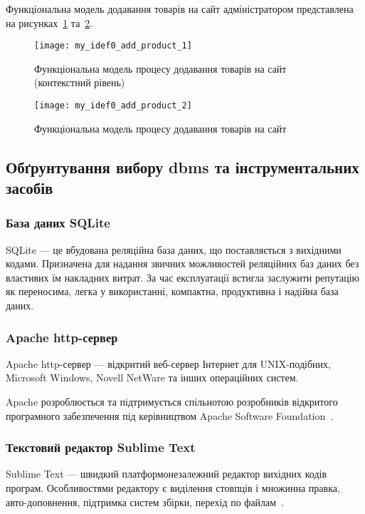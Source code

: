 Функціональна модель додавання товарів на сайт адміністратором представлена на рисунках~\ref{fig:my_idef0_add_product_1} та~\ref{fig:my_idef0_add_product_2}.
\begin{figure}[H]
    \centering
    \texttt{[image: my\_idef0\_add\_product\_1]}
    \caption{Функціональна модель процесу додавання товарів на сайт (контекстний рівень)}
    \label{fig:my_idef0_add_product_1}
\end{figure}
\begin{figure}[H]
    \centering 
    \texttt{[image: my\_idef0\_add\_product\_2]}
    \caption{Функціональна модель процесу додавання товарів на сайт}
    \label{fig:my_idef0_add_product_2}
\end{figure}

\subsection{Обґрунтування вибору \acrshort{dbms} та інструментальних засобів}

\subsubsection{База даних SQLite}
SQLite --- це вбудована реляційна база даних, що поставляється з вихідними кодами.
Призначена для надання звичних можливостей реляційних баз даних без властивих їм накладних витрат.
За час експлуатації встигла заслужити репутацію як переносима, легка у використанні, компактна, продуктивна і надійна база даних\cite{SQLite2006a}.

\subsubsection{Apache \acrshort{http}-сервер}
Apache \acrshort{http}-сервер --- відкритий веб-сервер Інтернет для UNIX-подібних, Microsoft Windows, Novell NetWare та інших операційних систем.

Apache розроблюється та підтримується спільнотою розробників відкритого програмного забезпечення під керівництвом Apache Software Foundation~\cite{ApacheServer}.

\subsubsection{Текстовий редактор Sublime Text}
Sublime Text --- швидкий платформонезалежний редактор вихідних кодів програм.
Особливостями редактору є виділення стовпців і множинна правка, авто-доповнення, підтримка систем збірки, перехід по файлам~\cite{SublimeText}.


